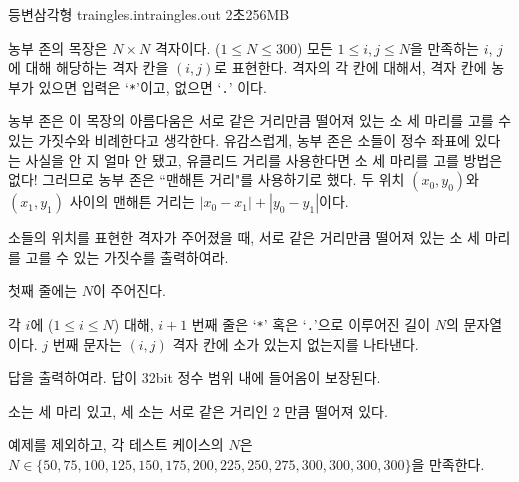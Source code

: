 \begin{problem}{등변삼각형}
	{traingles.in}{traingles.out}
	{2초}{256MB}{}
	
	농부 존의 목장은 $N \times N$ 격자이다. ($1 \le N \le 300$) 모든 $1 \le i, j \le N$을 만족하는 $i$, $j$에 대해 해당하는 격자 칸을 $(i, j)$로 표현한다. 격자의 각 칸에 대해서, 격자 칸에 농부가 있으면 입력은 `\texttt{*}'이고, 없으면 `\texttt{.}' 이다. 
	
	농부 존은 이 목장의 아름다움은 서로 같은 거리만큼 떨어져 있는 소 세 마리를 고를 수 있는 가짓수와 비례한다고 생각한다. 유감스럽게, 농부 존은 소들이 정수 좌표에 있다는 사실을 안 지 얼마 안 됐고, 유클리드 거리를 사용한다면 소 세 마리를 고를 방법은 없다! 그러므로 농부 존은 ``맨해튼 거리"를 사용하기로 했다. 두 위치 $(x_0, y_0)$와 $(x_1, y_1)$ 사이의 맨해튼 거리는 $|x_0 - x_1| + |y_0-y_1|$이다.
	
	소들의 위치를 표현한 격자가 주어졌을 때, 서로 같은 거리만큼 떨어져 있는 소 세 마리를 고를 수 있는 가짓수를 출력하여라.
	
	
	\InputFile
	
	첫째 줄에는 $N$이 주어진다.
	
	각 $i$에 ($1 \le i \le N$) 대해, $i+1$ 번째 줄은 `\texttt{*}' 혹은 `\texttt{.}'으로 이루어진 길이 $N$의 문자열이다. $j$ 번째 문자는 $(i, j)$ 격자 칸에 소가 있는지 없는지를 나타낸다.
	
	\OutputFile
	
	답을 출력하여라. 답이 32bit 정수 범위 내에 들어옴이 보장된다.
	
	
	\Example
		
	\begin{example}
	\end{example}

	소는 세 마리 있고, 세 소는 서로 같은 거리인 2 만큼 떨어져 있다.
	
	\Scoring
	
	예제를 제외하고, 각 테스트 케이스의 $N$은 $N \in \{50, 75, 100, 125, 150, 175, 200, 225, 250, 275, 300, 300, 300, 300\}$을 만족한다.
	
	
	
	
	
\end{problem}

